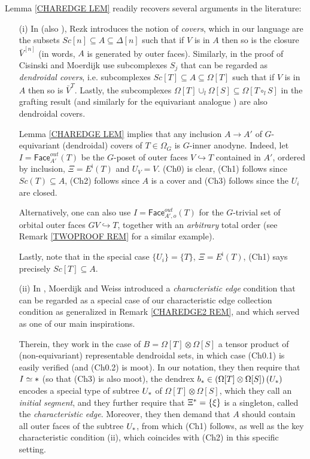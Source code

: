 \documentclass[a4paper,10pt
,draft
]{article}%
\begin{document}
\begin{remark} \label{RECOVER REM}
Lemma \ref{CHAREDGE LEM} readily recovers several arguments in the literature:
\begin{itemize}
\item[(i)] In \cite[\S 10]{Rez01} (also \cite[\S 6.2]{Rez10}), Rezk introduces the notion of \textit{covers}, which in our language are the subsets
$Sc[n] \subseteq A \subseteq \Delta[n]$
such that if $V$ is in $A$ then so is the closure $\bar{V}^{[n]}$
(in words, $A$ is generated by outer faces).
Similarly, in the proof of \cite[Prop. 2.4]{CM13a}
Cisinski and Moerdijk use subcomplexes $S_j$ that can be regarded as
\textit{dendroidal covers},
i.e. subcomplexes
$Sc[T] \subseteq A \subseteq \Omega[T]$
such that if $V$ is in $A$ then so is $\bar{V}^{T}$.
Lastly, the subcomplexes 
$\Omega[T] \cup_l \Omega[S] \subseteq \Omega[T \circ_l S]$
in the grafting result \cite[Lemma 5.2]{MW09} (and similarly for the equivariant analogue \cite[Prop. 6.19]{Per17}) are also dendroidal covers.

Lemma \ref{CHAREDGE LEM} implies
that any inclusion $A \to A'$ of $G$-equivariant (dendroidal) covers of $T\in \Omega_G$
is $G$-inner anodyne. 
Indeed, let $I=\mathsf{Face}_{A'}^{out}(T)$ be the $G$-poset of outer faces $V \hookrightarrow T$ contained in $A'$, ordered by inclusion, 
$\Xi = E^{\mathsf{i}}(T)$ and $U_V = V$.
(Ch0) is clear, (Ch1) follows since 
$Sc(T) \subseteq A$, (Ch2) follows since $A$ is a cover and
(Ch3) follows since the $U_i$ are closed.

Alternatively, one can also use $I=\mathsf{Face}_{A',o}^{out}(T)$
for the $G$-trivial set of orbital outer faces 
$GV \hookrightarrow T$,
together with an \textit{arbitrary} total order (see Remark \ref{TWOPROOF REM} for a similar example).

Lastly, note that in the special case 
$\{U_i\}=\{T\}$, $\Xi=E^{\mathsf{i}}(T)$,
(Ch1) says precisely $Sc[T] \subseteq A$.


\item[(ii)] In \cite[Lemma 9.7]{MW09}, Moerdijk and Weiss introduced a \textit{characteristic edge} condition that can be regarded as a special case of our characteristic edge collection condition as generalized in Remark \ref{CHAREDGE2 REM}, and which served as one of our main inspirations.

Therein, they work in the case of $B= \Omega[T] \otimes \Omega[S]$
a tensor product of (non-equivariant) representable dendroidal sets, in which case (Ch0.1) is easily verified (and (Ch0.2) is moot).
In our notation, they then require that $I \simeq \**$ (so that (Ch3) is also moot), 
the dendrex 
$b_{\**} \in \left(\Omega[T] \otimes \Omega[S]\right)(U_{\**})$ encodes a special type of subtree $U_{\**}$ of $\Omega[T] \otimes \Omega[S]$, which they call an \textit{initial segment},
and they further require that $\Xi^{\**} = \{\xi\}$ is a singleton, called the \textit{characteristic edge}.
Moreover, they then demand that $A$ should contain all outer faces of the subtree $U_{\**}$, from which (Ch1) follows, 
as well as the key characteristic condition 
\cite[Lemma 9.7]{MW09}(ii),
which coincides with (Ch2) in this specific setting.


\end{itemize}
\end{remark}
\end{document}

